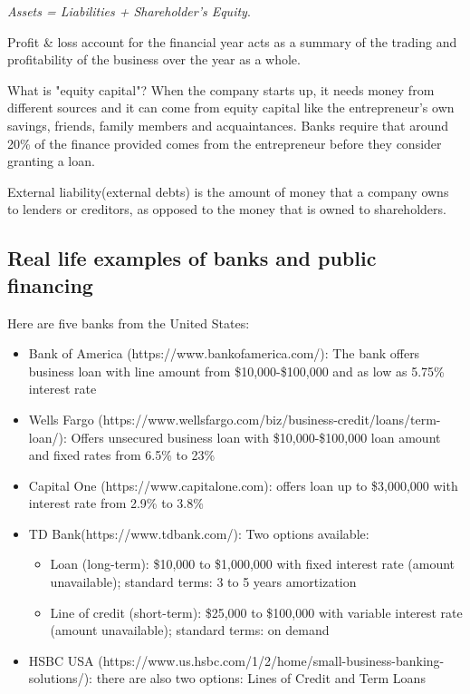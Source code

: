 \documentclass[12pt]{article}
\begin{document}
\begin{center}
\textit{Assets = Liabilities + Shareholder's Equity}.
\end{center}

Profit \& loss account for the financial year acts as a summary of the trading and profitability of the business over the year as a whole.

What is "equity capital"? When the company starts up, it needs money from different sources and it can come from equity capital like the entrepreneur's own savings, friends, family members and acquaintances. Banks require that around 20\% of the finance provided comes from the entrepreneur before they consider granting a loan.

External liability(external debts) is the amount of money that a company owns to lenders or creditors, as opposed to the money that is owned to shareholders.

\subsection{Real life examples of banks and public financing}

Here are five banks from the United States:

\begin{itemize}
	\item{Bank of America (https://www.bankofamerica.com/): The bank offers business loan with line amount from \$10,000-\$100,000 and as low as 5.75\% interest rate}
	\item{Wells Fargo (https://www.wellsfargo.com/biz/business-credit/loans/term-loan/): Offers unsecured business loan with \$10,000-\$100,000 loan amount and fixed rates from 6.5\% to 23\%}
	\item{Capital One (https://www.capitalone.com): offers loan up to \$3,000,000 with interest rate from 2.9\% to 3.8\%}
	\item{TD Bank(https://www.tdbank.com/): Two options available:
	\begin{itemize}
		\item{Loan (long-term): \$10,000 to \$1,000,000 with fixed interest rate (amount unavailable); standard terms: 3 to 5 years amortization}
		\item{Line of credit (short-term): \$25,000 to \$100,000 with variable interest rate (amount unavailable); standard terms: on demand}
	\end{itemize}}
	\item{HSBC USA (https://www.us.hsbc.com/1/2/home/small-business-banking-solutions/): there are also two options: Lines of Credit and Term Loans}
\end{itemize}
\end{document}
